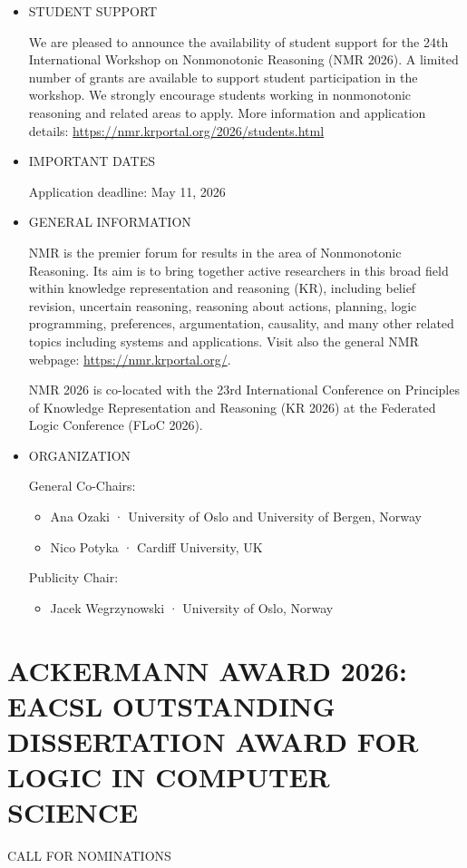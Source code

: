 \documentclass[prodmode,acmtecs]{acmsmall} %
\begin{document}
\begin{itemize}\item  STUDENT SUPPORT 
 
  We are pleased to announce the availability of student support for the 24th International Workshop on Nonmonotonic Reasoning (NMR 2026).  A limited number of grants are available to support student participation in the workshop. We strongly encourage students working in nonmonotonic reasoning and related areas to apply. More information and application details: \href{https://nmr.krportal.org/2026/students.html}{https://nmr.krportal.org/2026/students.html} 
 
\item  IMPORTANT DATES 
 
Application deadline: May 11, 2026 
 
\item  GENERAL INFORMATION 
 
  NMR is the premier forum for results in the area of Nonmonotonic Reasoning. Its aim is to bring together active researchers in this broad field within knowledge representation and reasoning (KR), including belief revision, uncertain reasoning, reasoning about actions, planning, logic programming, preferences, argumentation, causality, and many other related topics including systems and applications. Visit also the general NMR webpage: \href{https://nmr.krportal.org/}{https://nmr.krportal.org/}. 
 
  NMR 2026 is co-located with the 23rd International Conference on Principles of Knowledge Representation and Reasoning (KR 2026) at the Federated Logic Conference (FLoC 2026). 
 
\item  ORGANIZATION 
 
   General Co-Chairs: 
 
\begin{itemize}\item  Ana Ozaki · University of Oslo and University of Bergen, Norway
\item  Nico Potyka · Cardiff University, UK
\end{itemize} 
  Publicity Chair: 
 
\begin{itemize}\item  Jacek Wegrzynowski · University of Oslo, Norway
\end{itemize} 
\end{itemize}\section{ACKERMANN AWARD 2026: EACSL OUTSTANDING DISSERTATION AWARD FOR LOGIC IN COMPUTER SCIENCE}\label{ACKERMANNAWARD2026}CALL FOR NOMINATIONS 
\end{document}
